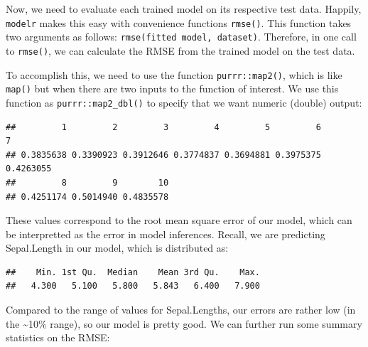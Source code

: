 \documentclass[]{article}
\newenvironment{Shaded}{\begin{snugshade}}{\end{snugshade}}
\newcommand{\KeywordTok}[1]{\textcolor[rgb]{0.13,0.29,0.53}{\textbf{#1}}}
\newcommand{\StringTok}[1]{\textcolor[rgb]{0.31,0.60,0.02}{#1}}
\newcommand{\OperatorTok}[1]{\textcolor[rgb]{0.81,0.36,0.00}{\textbf{#1}}}
\newcommand{\NormalTok}[1]{#1}
\begin{document}
Now, we need to evaluate each trained model on its respective test data.
Happily, \texttt{modelr} makes this easy with convenience functions
\texttt{rmse()}. This function takes two arguments as follows:
\texttt{rmse(fitted\ model,\ dataset)}. Therefore, in one call to
\texttt{rmse()}, we can calculate the RMSE from the trained model on the
test data.

To accomplish this, we need to use the function \texttt{purrr::map2()},
which is like \texttt{map()} but when there are two inputs to the
function of interest. We use this function as
\texttt{purrr::map2\_dbl()} to specify that we want numeric (double)
output:

\begin{Shaded}
\end{Shaded}

\begin{verbatim}
##         1         2         3         4         5         6         7 
## 0.3835638 0.3390923 0.3912646 0.3774837 0.3694881 0.3975375 0.4263055 
##         8         9        10 
## 0.4251174 0.5014940 0.4835578
\end{verbatim}

These values correspond to the root mean square error of our model,
which can be interpretted as the error in model inferences. Recall, we
are predicting Sepal.Length in our model, which is distributed as:

\begin{Shaded}
\end{Shaded}

\begin{verbatim}
##    Min. 1st Qu.  Median    Mean 3rd Qu.    Max. 
##   4.300   5.100   5.800   5.843   6.400   7.900
\end{verbatim}

Compared to the range of values for Sepal.Lengths, our errors are rather
low (in the \textasciitilde{}10\% range), so our model is pretty good.
We can further run some summary statistics on the RMSE:
\end{document}
